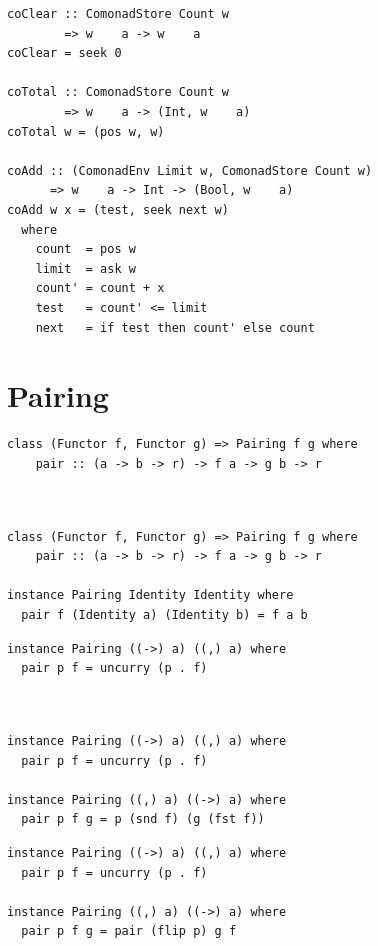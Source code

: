 \documentclass{beamer}
\begin{document}
\begin{frame}[fragile]
\begin{overprint}
\begin{verbatim}
coClear :: ComonadStore Count w
        => w    a -> w    a
coClear = seek 0

coTotal :: ComonadStore Count w
        => w    a -> (Int, w    a)
coTotal w = (pos w, w)

coAdd :: (ComonadEnv Limit w, ComonadStore Count w)
      => w    a -> Int -> (Bool, w    a)
coAdd w x = (test, seek next w)
  where
    count  = pos w
    limit  = ask w
    count' = count + x
    test   = count' <= limit
    next   = if test then count' else count
  \end{verbatim}
  \end{overprint}
\end{frame}

\section{Pairing}

\begin{frame}[fragile]
  \begin{overprint}
  \begin{verbatim}
class (Functor f, Functor g) => Pairing f g where
    pair :: (a -> b -> r) -> f a -> g b -> r



  \end{verbatim}
  \begin{verbatim}
class (Functor f, Functor g) => Pairing f g where
    pair :: (a -> b -> r) -> f a -> g b -> r

instance Pairing Identity Identity where
  pair f (Identity a) (Identity b) = f a b
  \end{verbatim}
  \end{overprint}
\end{frame}

\begin{frame}[fragile]
  \begin{overprint}
  \begin{verbatim}
instance Pairing ((->) a) ((,) a) where
  pair p f = uncurry (p . f)



  \end{verbatim}
  \begin{verbatim}
instance Pairing ((->) a) ((,) a) where
  pair p f = uncurry (p . f)

instance Pairing ((,) a) ((->) a) where
  pair p f g = p (snd f) (g (fst f))
  \end{verbatim}
  \begin{verbatim}
instance Pairing ((->) a) ((,) a) where
  pair p f = uncurry (p . f)

instance Pairing ((,) a) ((->) a) where
  pair p f g = pair (flip p) g f
  \end{verbatim}
  \end{overprint}
\end{frame}
\end{document}
